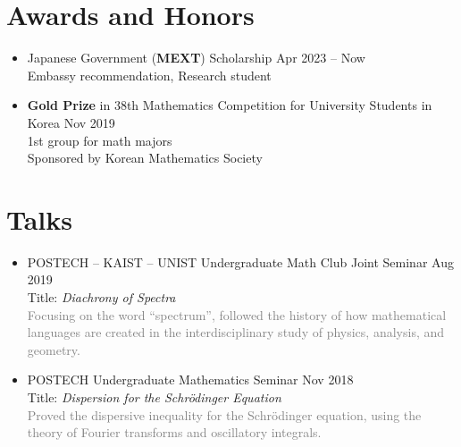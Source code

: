\documentclass[11pt,a4paper]{article}
\begin{document}
\section*{Awards and Honors}
\begin{itemize}
\item
	Japanese Government (\textbf{MEXT}) Scholarship
	\hfill{\small Apr 2023 -- Now}\\
	Embassy recommendation, Research student
\item
	\textbf{Gold Prize} in 38th Mathematics Competition for University Students in Korea
	\hfill{\small Nov 2019}\\
	1st group for math majors\\
	Sponsored by Korean Mathematics Society
\end{itemize}




\section*{Talks}
\begin{itemize}
\item
	POSTECH -- KAIST -- UNIST Undergraduate Math Club Joint Seminar
	\hfill{\small Aug 2019}\\
	Title: \emph{Diachrony of Spectra}\\
	\textcolor{gray}{Focusing on the word ``spectrum'', followed the history of how mathematical languages are created in the interdisciplinary study of physics, analysis, and geometry.}
\item
	POSTECH Undergraduate Mathematics Seminar
	\hfill{\small Nov 2018}\\
	Title: \emph{Dispersion for the Schr\"odinger Equation}\\
	\textcolor{gray}{Proved the dispersive inequality for the Schr\"odinger equation, using the theory of Fourier transforms and oscillatory integrals.}
\end{itemize}
\end{document}
